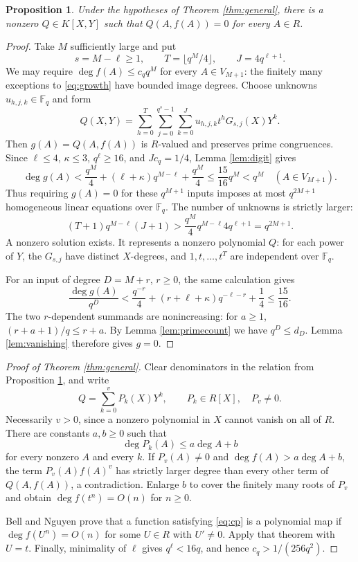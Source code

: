 \documentclass[11pt]{article}
\newtheorem{proposition}[theorem]{Proposition}
\newcommand{\F}{\mathbb F}
\begin{document}
\begin{proposition}\label{prop:curve}
Under the hypotheses of Theorem \ref{thm:general}, there is a nonzero
$Q\in K[X,Y]$ such that $Q(A,f(A))=0$ for every $A\in R$.
\end{proposition}
\begin{proof}
Take $M$ sufficiently large and put
\[
 s=M-\ell\ge1,\qquad T=\lfloor q^M/4\rfloor,
 \qquad J=4q^{\ell+1}.
\]
We may require $\deg f(A)\le c_qq^M$ for every $A\in V_{M+1}$:
the finitely many exceptions to \eqref{eq:growth} have bounded image
degrees. Choose unknowns $u_{h,j,k}\in\F_q$ and form
\begin{equation}\label{eq:auxiliary}
 Q(X,Y)=\sum_{h=0}^T\sum_{j=0}^{q^s-1}\sum_{k=0}^J
       u_{h,j,k}t^hG_{s,j}(X)Y^k.
\end{equation}
Then $g(A)=Q(A,f(A))$ is $R$-valued and preserves prime congruences.
Since $\ell\le4$, $\kappa\le3$, $q^\ell\ge16$, and $Jc_q=1/4$,
Lemma \ref{lem:digit} gives
\begin{equation}\label{eq:ballheight}
 \deg g(A)<\frac{q^M}{4}+(\ell+\kappa)q^{M-\ell}
                       +\frac{q^M}{4}
 \le\frac{15}{16}q^M<q^M
 \quad(A\in V_{M+1}).
\end{equation}
Thus requiring $g(A)=0$ for these $q^{M+1}$ inputs imposes at most
$q^{2M+1}$ homogeneous linear equations over $\F_q$. The number of
unknowns is strictly larger:
\[
 (T+1)q^{M-\ell}(J+1)
 >\frac{q^M}{4}q^{M-\ell}4q^{\ell+1}=q^{2M+1}.
\]
A nonzero solution exists. It represents a nonzero polynomial $Q$:
for each power of $Y$, the $G_{s,j}$ have distinct $X$-degrees, and
$1,t,\ldots,t^T$ are independent over $\F_q$.

For an input of degree $D=M+r$, $r\ge0$, the same calculation gives
\begin{equation}\label{eq:outerheight}
 \frac{\deg g(A)}{q^D}
 <\frac{q^{-r}}4+(r+\ell+\kappa)q^{-\ell-r}+\frac14
 \le\frac{15}{16}.
\end{equation}
The two $r$-dependent summands are nonincreasing: for $a\ge1$,
$(r+a+1)/q\le r+a$. By Lemma \ref{lem:primecount} we have
$q^D\le d_D$. Lemma \ref{lem:vanishing} therefore gives $g=0$.
\end{proof}

\begin{proof}[Proof of Theorem \ref{thm:general}]
Clear denominators in the relation from Proposition \ref{prop:curve},
and write
\[
 Q=\sum_{k=0}^vP_k(X)Y^k,\qquad P_k\in R[X],\quad P_v\ne0.
\]
Necessarily $v>0$, since a nonzero polynomial in $X$ cannot
vanish on all of $R$. There are constants $a,b\ge0$ such that
\[
 \deg P_k(A)\le a\deg A+b
\]
for every nonzero $A$ and every $k$.
If $P_v(A)\ne0$ and $\deg f(A)>a\deg A+b$, the term
$P_v(A)f(A)^v$ has strictly larger degree than every other term of
$Q(A,f(A))$, a contradiction. Enlarge $b$ to cover the finitely many
roots of $P_v$ and obtain $\deg f(t^n)=O(n)$ for $n\ge0$.

Bell and Nguyen \cite[Theorem 3.1]{BN} prove that a function satisfying
\eqref{eq:cp} is a polynomial map if $\deg f(U^n)=O(n)$ for some
$U\in R$ with $U'\ne0$. Apply that theorem with $U=t$. Finally,
minimality of $\ell$ gives $q^\ell<16q$, and hence
$c_q>1/(256q^2)$.
\end{proof}
\end{document}
